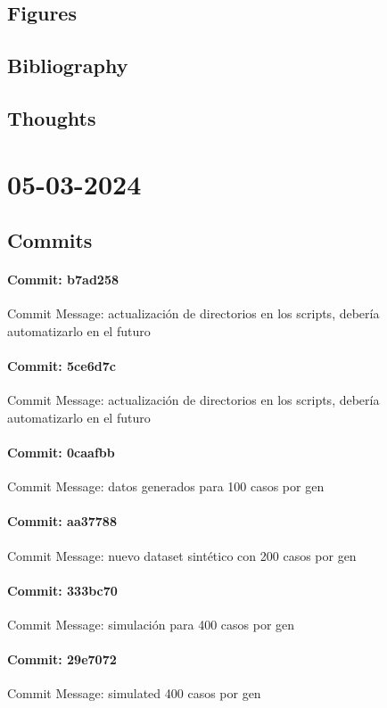 \documentclass{article}
\begin{document}
\subsection{Figures}
\subsection{Bibliography}
\subsection{Thoughts}

\section{05-03-2024}
\subsection{Commits}
\paragraph{Commit: b7ad258}
Commit Message: actualización de directorios en los scripts, debería automatizarlo en el futuro

\paragraph{Commit: 5ce6d7c}
Commit Message: actualización de directorios en los scripts, debería automatizarlo en el futuro

\paragraph{Commit: 0caafbb}
Commit Message: datos generados para 100 casos por gen

\paragraph{Commit: aa37788}
Commit Message: nuevo dataset sintético con 200 casos por gen

\paragraph{Commit: 333bc70}
Commit Message: simulación para 400 casos por gen

\paragraph{Commit: 29e7072}
Commit Message: simulated 400 casos por gen
\end{document}
